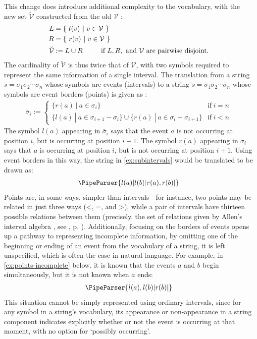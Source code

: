 \documentclass[a4paper,12pt,leqno,twoside]{article}
\newcommand{\vph}[1]{\vphantom{#1}}
\newcommand{\ebox}[1]{\fbox{$\vph{'(),}#1$}}
\newcommand{\V}{\mathcal{V}}
\newcommand{\EventString}[1]{%
	\renewcommand*{\do}[1]{\ebox{##1}}%
	\PipeParser{#1}%
}
\begin{document}
This change does introduce additional complexity to the vocabulary, with the new set $\breve{\V}$ constructed from the old $\V$ \cite[p. 37]{Fernando2018}:
\begin{align}
	L &= \{ ~l(v) ~|~ v \in \V~ \}\notag\\
	R &= \{ ~r(v) ~|~ v \in \V~ \}\notag\\
	\breve{\V} &:= L \cup R ~~~~~~~~\text{if } L, R, \text{ and } \V \text{ are pairwise disjoint.}
\end{align}
The cardinality of $\breve{\V}$ is thus twice that of $\V$, with two symbols required to represent the same information of a single interval. The translation from a string $s = \sigma_1\sigma_2\cdots\sigma_n$ whose symbols are events (intervals) to a string $\breve{s} = \breve{\sigma_1}\breve{\sigma_2}\cdots\breve{\sigma_n}$ whose symbols are event borders (points) is given as \cite[p. 38]{Fernando2018}:
\begin{align}
	\breve{\sigma_i} := \begin{cases}
		\{ r(a) ~|~ a \in \sigma_i \} & \text{if}~ i = n\\
		\{ l(a) ~|~ a \in \sigma_{i+1} - \sigma_i \} \cup \{ r(a) ~|~ a \in \sigma_{i} - \sigma_{i+1} \} & \text{if}~ i < n
	\end{cases}
\end{align}
The symbol $l(a)$ appearing in $\breve{\sigma_i}$ says that the event $a$ is not occurring at position $i$, but is occurring at position $i+1$. The symbol $r(a)$ appearing in $\breve{\sigma_i}$ says that $a$ is occurring at position $i$, but is not occurring at position $i+1$. Using event borders in this way, the string in \cref{ex:subintervals} would be translated to be drawn as:
\begin{align}
	\EventString{l(a)|l(b)|r(a),r(b)|{}}
\end{align}
Points are, in some ways, simpler than intervals---for instance, two points may be related in just three ways (\textless, =, and \textgreater), while a pair of intervals have thirteen possible relations between them (precisely, the set of relations given by Allen's interval algebra \citep{allen1983maintaining}, see , p. \pageref{tab:allen-rels-strings}). Additionally, focusing on the borders of events opens up a pathway to representing incomplete information, by omitting one of the beginning or ending of an event from the vocabulary of a string, it is left unspecified, which is often the case in natural language. For example, in \cref{ex:points-incomplete} below, it is known that the events $a$ and $b$ begin simultaneously, but it is not known when $a$ ends:
\begin{align}\label{ex:points-incomplete}
	\EventString{l(a),l(b)|r(b)|{}}
\end{align}
This situation cannot be simply represented using ordinary intervals, since for any symbol in a string's vocabulary, its appearance or non-appearance in a string component indicates explicitly whether or not the event is occurring at that moment, with no option for `possibly occurring'.
\end{document}
